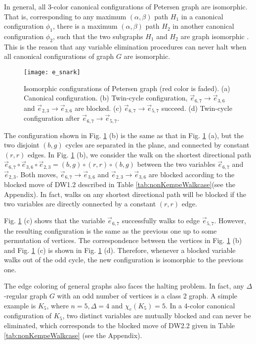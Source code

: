 \documentclass[11pt]{article}
\begin{document}
In general, all 3-color canonical configurations of Petersen graph are isomorphic. That is, corresponding to any maximum $(\alpha,\beta)$ path $H_1$  in a canonical configuration $\phi_1$, there is a maximum $(\alpha,\beta)$ path $H_2$  in another canonical configuration $\phi_2$, such that the two subgraphs $H_1$ and $H_2$ are graph isomorphic \cite{west2001introduction}. This is the reason that any variable elimination procedures can never halt when all canonical configurations of graph $G$ are isomorphic. 
\begin{figure}[htpb]
	\centering
	\texttt{[image: e\_snark]}
	\caption{Isomorphic configurations of Petersen graph (red color is faded). (a) Canonical configuration. (b) Twin-cycle configuration, $\vec{e}_{6,7} \rightarrow \vec{e}_{3,6}$ and $\vec{e}_{2,3} \rightarrow \vec{e}_{3,6}$ are blocked. (c) $\vec{e}_{6,7} \rightarrow \vec{e}_{5,7}$ succeed. (d) Twin-cycle configuration after $\vec{e}_{6,7} \rightarrow \vec{e}_{5,7}$.}
	\label{fig:snark}
\end{figure}

The configuration shown in Fig. \ref{fig:snark} (b) is the same as that in Fig. \ref{fig:snark} (a), but the two disjoint $(b,g)$ cycles are separated in the plane, and connected by constant $(r,r)$ edges. In Fig. \ref{fig:snark} (b), we consider the walk on the shortest directional path $\vec{e}_{6,7} \circ \vec{e}_{3,6} \circ \vec{e}_{2,3}=(b,g)\circ (r,r)\circ (b,g)$ between the two variables $\vec{e}_{6,7}$  and  $\vec{e}_{2,3}$. Both moves, $\vec{e}_{6,7} \rightarrow \vec{e}_{3,6}$ and $\vec{e}_{2,3} \rightarrow \vec{e}_{3,6}$ are blocked according to the blocked move of DW1.2 described in Table \ref{tab:nonKempeWalkcase}(see the Appendix). In fact, walks on any shortest directional path will be blocked if the two variables are directly connected by a constant $(r,r)$ edge. 

Fig. \ref{fig:snark} (c) shows that the variable $\vec{e}_{6,7}$ successfully walks to edge $\vec{e}_{5,7}$. However, the resulting configuration is the same as the previous one up to some permutation of vertices. The correspondence between the vertices in Fig. \ref{fig:snark} (b) and Fig. \ref{fig:snark} (c) is shown in Fig. \ref{fig:snark} (d). Therefore, whenever a blocked variable walks out of the odd cycle, the new configuration is isomorphic to the previous one.



The edge coloring of general graphs also faces the halting problem. In fact, any $\Delta$-regular graph $G$ with an odd number of vertices is a class 2 graph. A simple example is $K_5$, where $n=5, \Delta=4$ and $\chi_e(K_5 )=5$. In a 4-color canonical configuration of $K_5$, two distinct variables are mutually blocked and can never be eliminated, which corresponds to the blocked move of DW2.2 given in Table \ref{tab:nonKempeWalkcase} (see the Appendix).
\end{document}
